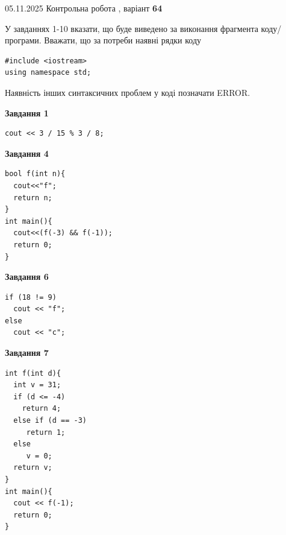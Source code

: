 \documentclass[12pt, ukrainian]{article}
\begin{document}
{\Large{05.11.2025 Контрольна робота , варіант  \No \textbf { 64 }\par}}
{
\begin {large}
У завданнях 1-10 вказати, що буде виведено за виконання фрагмента коду/про\-гра\-ми.
Вважати, що за потреби наявні рядки коду
\begin{verbatim}
#include <iostream>
using namespace std;
\end{verbatim}
Наявність інших синтаксичних проблем у коді позначати ERROR.

\begin{minipage}[t]{7.0cm}

\begin{center}
\textbf{Завдання 1}
\end{center}
\vspace{-8mm}

\begin{verbatim}
cout << 3 / 15 % 3 / 8;
\end{verbatim}



\begin{center}
\textbf{Завдання 4}
\end{center}
\vspace{-8mm}

\begin{verbatim}
bool f(int n){
  cout<<"f";
  return n;
}
int main(){
  cout<<(f(-3) && f(-1));
  return 0;
}
\end{verbatim}



\begin{center}
\textbf{Завдання 6}
\end{center}
\vspace{-8mm}

\begin{verbatim}
if (18 != 9)
  cout << "f";
else
  cout << "c";
\end{verbatim}



\begin{center}
\textbf{Завдання 7}
\end{center}
\vspace{-8mm}

\begin{verbatim}
int f(int d){
  int v = 31;
  if (d <= -4)
    return 4;
  else if (d == -3)
     return 1;
  else
     v = 0;
  return v;
}
int main(){
  cout << f(-1);
  return 0;
}
\end{verbatim}


\end{minipage}
\end{large}}
\end{document}
